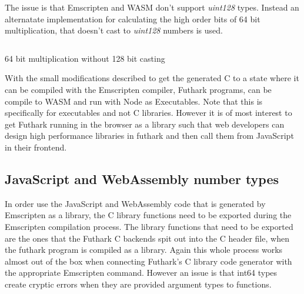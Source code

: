 \documentclass[11pt]{book}
\begin{document}
The issue is that Emscripten and WASM don't support \textit{uint128} types. Instead an alternatate implementation for calculating the high order bits of 64 bit multiplication, that doesn't cast to \textit{uint128} numbers is used. 

\begin{listing}[H] 
        \inputminted[fontsize=\small,baselinestretch=0.5,linenos]{C}{code/compiler/int128_wasm.c}
        \caption{64 bit multiplication without 128 bit casting}
        \label{lst:integrate-js}    
\end{listing} 


With the small modifications described to get the generated C to a state where it can be compiled with the Emscripten compiler, Futhark programs, can be compile to WASM and run with Node as Executables. Note that this is specifically for executables and not C libraries. However it is of most interest to get Futhark running in the browser as a library such that web developers can design high performance libraries in futhark and then call them from JavaScript in their frontend. 


\subsection{JavaScript and WebAssembly number types}

In order use the JavaScript and WebAssembly code that is generated by Emscripten as a library, the C library functions need to be exported during the Emscripten compilation process. The library functions that need to be exported are the ones that the Futhark C backends spit out into the C header file, when the futhark program is compiled as a library. Again this whole process works almost out of the box when connecting Futhark's C library code generator with the appropriate Emscripten command. However an issue is that int64 types create cryptic errors when they are provided argument types to functions. 
\end{document}
